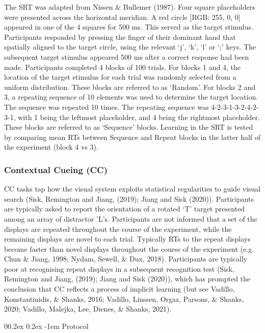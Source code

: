 \documentclass[
  man]{apa6}
\makeatletter
\let\oldparagraph\paragraph
\renewcommand{\paragraph}[1]{\oldparagraph{#1}\mbox{}}
\renewcommand{\paragraph}{\@startsection{paragraph}{4}{\parindent}%
  {0\baselineskip \@plus 0.2ex \@minus 0.2ex}%
  {-1em}%
  {\normalfont\normalsize\bfseries\itshape\typesectitle}}
\makeatother
\begin{document}
The SRT was adapted from Nissen \& Bullemer (1987). Four square placeholders were presented across the horizontal meridian. A red circle {[}RGB: 255, 0, 0{]} appeared in one of the 4 squares for 500 ms. This served as the target stimulus. Participants responded by pressing the finger of their dominant hand that spatially aligned to the target circle, using the relevant `j', `k', `l' or `;' keys. The subsequent target stimulus appeared 500 ms after a correct response had been made. Participants completed 4 blocks of 100 trials. For blocks 1 and 4, the location of the target stimulus for each trial was randomly selected from a uniform distribution. These blocks are referred to as `Random'. For blocks 2 and 3, a repeating sequence of 10 elements was used to determine the target location. The sequence was repeated 10 times. The repeating sequence was 4-2-3-1-3-2-4-2-3-1, with 1 being the leftmost placeholder, and 4 being the rightmost placeholder. These blocks are referred to as `Sequence' blocks. Learning in the SRT is tested by comparing mean RTs between Sequence and Repeat blocks in the latter half of the experiment (block 4 vs 3).

\hypertarget{contextual-cueing-cc}{%
\subsubsection{Contextual Cueing (CC)}\label{contextual-cueing-cc}}

\label{sec:CCMeth}

CC tasks tap how the visual system exploits statistical regularities to guide visual search (Sisk, Remington and Jiang, (2019); Jiang and Sisk (2020)). Participants are typically asked to report the orientation of a rotated `T' target presented among an array of distractor 'L's. Participants are not informed that a set of the displays are repeated throughout the course of the experiment, while the remaining displays are novel to each trial. Typically RTs to the repeat displays become faster than novel displays throughout the course of the experiment (e.g. Chun \& Jiang, 1998; Nydam, Sewell, \& Dux, 2018). Participants are typically poor at recognising repeat displays in a subsequent recognition test (Sisk, Remington and Jiang, (2019); Jiang and Sisk (2020)), which has prompted the conclusion that CC reflects a process of implicit learning (but see Vadillo, Konstantinidis, \& Shanks, 2016; Vadillo, Linssen, Orgaz, Parsons, \& Shanks, 2020; Vadillo, Malejka, Lee, Dienes, \& Shanks, 2021).

\hypertarget{protocol-3}{%
\paragraph{Protocol}\label{protocol-3}}
\end{document}
